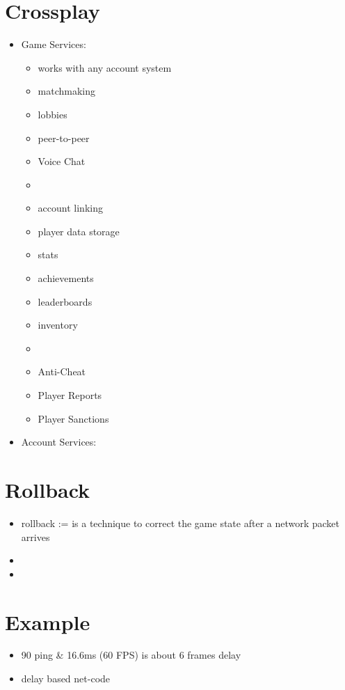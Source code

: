     \section{Crossplay}
        \begin{itemize}
            \item Game Services: 
            \begin{itemize}
                \item works with any account system
                \item matchmaking
                \item lobbies
                \item peer-to-peer
                \item Voice Chat
                \item 
                \item account linking
                \item player data storage
                \item stats
                \item achievements
                \item leaderboards
                \item inventory
                \item 
                \item Anti-Cheat
                \item Player Reports
                \item Player Sanctions
            \end{itemize}
            \item Account Services: 
        \end{itemize}

    \section{Rollback}
        \begin{itemize}
            \item rollback := is a technique to correct the game state after a network packet arrives
            \item 
            \item 
        \end{itemize}


    \section{Example}
        \begin{itemize}
            \item 90 ping \& 16.6ms (60 FPS) is about 6 frames delay
            \item delay based net-code
            
        \end{itemize}
    

